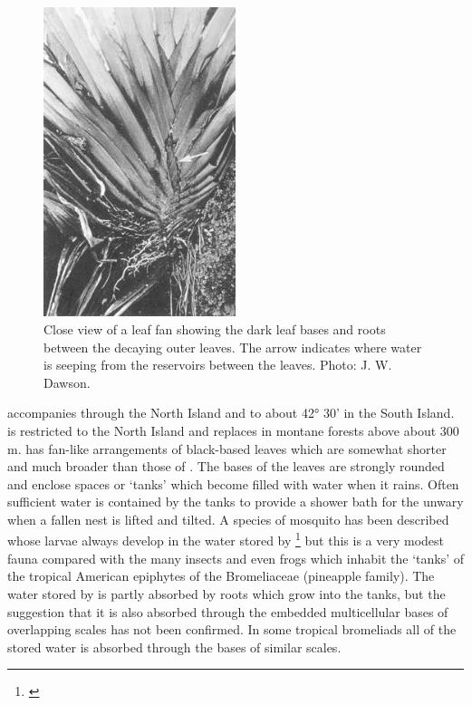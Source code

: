 \begin{figure}
	\includegraphics[width=0.5\textwidth]{graphics/figure41collospermum.jpg}
	\centering
	\caption[Close view of a Collospermum hastatum leaf fan]{Close view of a  leaf fan showing the dark leaf bases and roots between the decaying outer leaves.
    The arrow indicates where water is seeping from the reservoirs between the leaves.
	Photo: J. W. Dawson.}
	\label{fig:41collospermum}
\end{figure}

 accompanies  through the North Island and to about 42° 30' in the South Island.  is restricted to the North Island and replaces  in montane forests above about 300 m.  has fan-like arrangements of black-based leaves which are somewhat shorter and much broader than those of .
The bases of the leaves are strongly rounded and enclose spaces or `tanks' which become filled with water when it rains.
Often sufficient water is contained by the tanks to provide a shower bath for the unwary when a fallen  nest is lifted and tilted.
A species of mosquito has been described whose larvae always develop in the water stored by \footnote{\cite{belkin1968mosquito}} but this is a very modest fauna compared with the many insects and even frogs which inhabit the `tanks' of the tropical American epiphytes of the Bromeliaceae (pineapple family).
The water stored by  is partly absorbed by roots which grow into the tanks, but the suggestion that it is also absorbed through the embedded multicellular bases of overlapping scales has not been confirmed.
In some tropical bromeliads all of the stored water is absorbed through the bases of similar scales.

